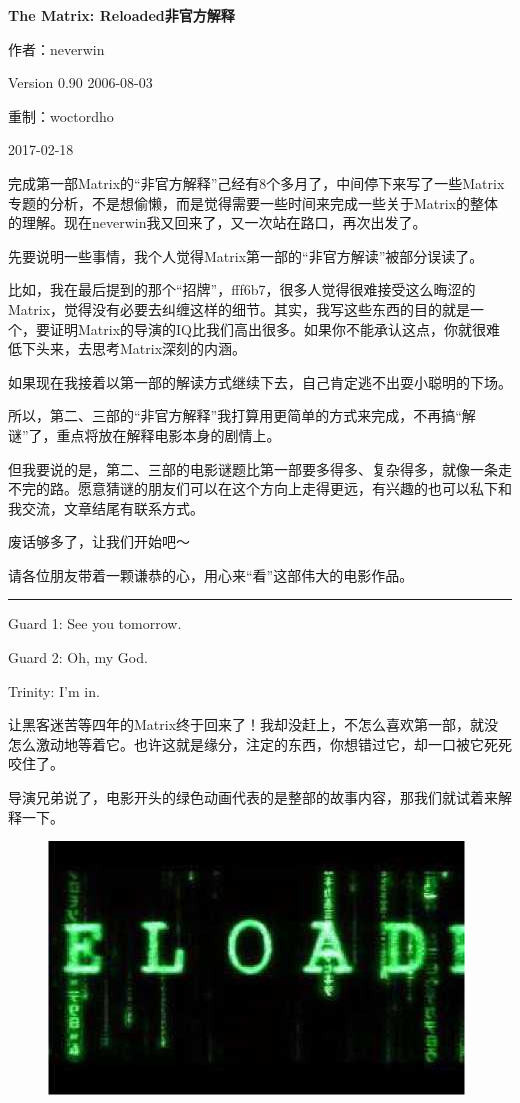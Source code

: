 \documentclass{ctexart}
\newcommand{\myparsep}{\noindent \rule[0.5ex]{\linewidth}{1pt}}
\newenvironment{myquote}{\color{green} \setlength{\leftskip}{6em} \setlength{\rightskip}{4em} \setlength{\parindent}{-2em}}{\par}
\begin{document}
\centerline{\bf \fontsize{15.75pt} \baselineskip \selectfont The Matrix: Reloaded非官方解释}
\vspace{12pt}
\centerline{作者：neverwin}
\centerline{Version 0.90 2006-08-03}
\centerline{重制：woctordho}
\centerline{2017-02-18}
\vspace{12pt}

完成第一部Matrix的“非官方解释”己经有8个多月了，中间停下来写了一些Matrix专题的分析，不是想偷懒，而是觉得需要一些时间来完成一些关于Matrix的整体的理解。现在neverwin我又回来了，又一次站在路口，再次出发了。

先要说明一些事情，我个人觉得Matrix第一部的“非官方解读”被部分误读了。

比如，我在最后提到的那个“招牌”，fff6b7，很多人觉得很难接受这么晦涩的Matrix，觉得没有必要去纠缠这样的细节。其实，我写这些东西的目的就是一个，要证明Matrix的导演的IQ比我们高出很多。如果你不能承认这点，你就很难低下头来，去思考Matrix深刻的内涵。

如果现在我接着以第一部的解读方式继续下去，自己肯定逃不出耍小聪明的下场。

所以，第二、三部的“非官方解释”我打算用更简单的方式来完成，不再搞“解谜”了，重点将放在解释电影本身的剧情上。

但我要说的是，第二、三部的电影谜题比第一部要多得多、复杂得多，就像一条走不完的路。愿意猜谜的朋友们可以在这个方向上走得更远，有兴趣的也可以私下和我交流，文章结尾有联系方式。

废话够多了，让我们开始吧～

请各位朋友带着一颗谦恭的心，用心来“看”这部伟大的电影作品。

\myparsep

\begin{myquote}
Guard 1: See you tomorrow.

Guard 2: Oh, my God.

Trinity: I'm in.
\end{myquote}

让黑客迷苦等四年的Matrix终于回来了！我却没赶上，不怎么喜欢第一部，就没怎么激动地等着它。也许这就是缘分，注定的东西，你想错过它，却一口被它死死咬住了。

导演兄弟说了，电影开头的绿色动画代表的是整部的故事内容，那我们就试着来解释一下。

\begin{figure}[htb]
\centering
\includegraphics[width=0.5\linewidth]{fig/read_reloaded-1}
\end{figure}
\end{document}
